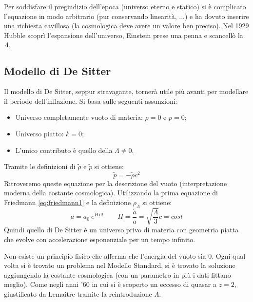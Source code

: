 Per soddisfare il pregiudizio dell'epoca (universo eterno e statico) si è complicato l'equazione in modo arbitrario (pur conservando linearità, ...) e ha dovuto inserire una richiesta cavillosa (la cosmologica deve avere un valore ben preciso). Nel 1929 Hubble scoprì l'espansione dell'universo, Einstein prese una penna e scancellò la $\Lambda$.

\subsection{Modello di De Sitter}
Il modello di De Sitter, seppur stravagante, tornerà utile più avanti per modellare il periodo dell'inflazione. Si basa sulle seguenti assunzioni:
\begin{itemize}
    \item Universo completamente vuoto di materia: $\rho=0$ e $p=0$;
    \item Universo piatto: $k=0$;
    \item L'unico contributo è quello della $\Lambda\neq 0$.
\end{itemize}
Tramite le definizioni di $\tilde{\rho}$ e $\tilde{p} $ si ottiene:
$$
\tilde{p}=-\tilde{\rho}c^2
$$
Ritroveremo queste equazione per la descrizione del vuoto (interpretazione moderna della costante cosmologica). Utilizzando la prima equazione di Friedmann \ref{eq:friedmann1} e la definizione $\rho_\Lambda$ si ottiene:
\begin{equation}
    a = a_0~e^{H\, \mathrm{d}t}\qquad H=\frac{\dot{a}}{a}=\sqrt{\frac{\Lambda}{3}}c= cost
\end{equation}
Quindi quello di De Sitter è un universo privo di materia con geometria piatta che evolve con accelerazione esponenziale per un tempo infinito. 

Non esiste un principio fisico che afferma che l'energia del vuoto sia 0. Ogni qual volta si è trovato un problema nel Modello Standard, si è trovato la soluzione aggiungendo la costante cosmologica (con un parametro in più i dati fittano meglio). Come negli anni '60 in cui si è scoperto un eccesso di quasar a $z=2$, giustificato da Lemaitre tramite la reintroduzione $\Lambda$.
\vspace*{0.5em}

